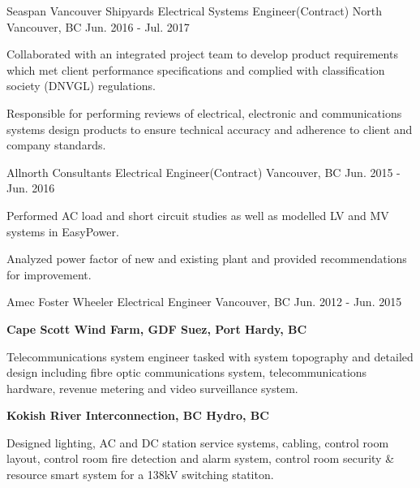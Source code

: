 \begin{cventries}
    \cventry
    {Seaspan Vancouver Shipyards} %
    {Electrical Systems Engineer(Contract)} %
    {North Vancouver, BC} %
    {Jun. 2016 - Jul. 2017} %
    { %
        \begin{cvitems}
            \item {Collaborated with an integrated project team to develop product requirements which met client performance specifications and complied with classification society (DNVGL) regulations.}
            \item {Responsible for performing reviews of electrical, electronic and communications systems design products to ensure technical accuracy and adherence to client and company standards.}
        \end{cvitems}
    }

    \cventry
    {Allnorth Consultants} %
    {Electrical Engineer(Contract)} %
    {Vancouver, BC} %
    {Jun. 2015 - Jun. 2016} %
    { %
        \begin{cvitems}
            \item {Performed AC load and short circuit studies as well as modelled LV and MV systems in EasyPower.}
            \item{Analyzed power factor of new and existing plant and provided recommendations for improvement.}
        \end{cvitems}
    }

    \cventry
    {Amec Foster Wheeler} %
    {Electrical Engineer} %
    {Vancouver, BC} %
    {Jun. 2012 - Jun. 2015} %
    { %
        \begin{cvitems}
            \item[]\textbf{Cape Scott Wind Farm, GDF Suez, Port Hardy, BC}
            \item {Telecommunications system engineer tasked with system topography and detailed design including fibre optic communications system, telecommunications hardware, revenue metering and video surveillance system.}
            \item[]\textbf{Kokish River Interconnection, BC Hydro, BC}
            \item{Designed lighting, AC and DC station service systems, cabling, control room layout, control room fire detection and alarm system, control room security \& resource smart system for a 138kV switching statiton.}
        \end{cvitems}
    }
\end{cventries}